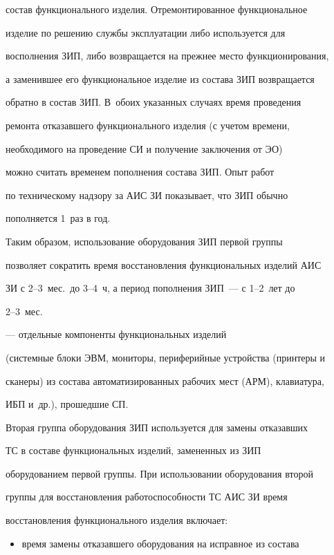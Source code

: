 \begin{description}
состав функционального изделия. Отремонтированное функциональное

изделие по решению службы эксплуатации либо используется для

восполнения ЗИП, либо возвращается на прежнее место функционирования,

а заменившее его функциональное изделие из состава ЗИП возвращается

обратно в состав ЗИП. В~обоих указанных случаях время проведения

ремонта отказавшего функционального изделия (с учетом времени,

необходимого на проведение СИ и получение заключения от ЭО)

можно считать временем пополнения состава ЗИП. Опыт работ

по техническому надзору за АИС ЗИ показывает, что ЗИП обычно

пополняется 1~раз в год.



     Таким образом, использование оборудования ЗИП первой группы

позволяет сократить время восстановления функциональных изделий АИС

ЗИ с 2--3~мес.\ до 3--4~ч, а период пополнения ЗИП~--- с 1--2~лет до

     2--3~мес.



\item[Группа 2] --- отдельные компоненты функциональных изделий

(системные блоки ЭВМ, мониторы, периферийные устройства (принтеры и

сканеры) из состава автоматизированных рабочих мест (АРМ), клавиатура,

ИБП и~др.), прошедшие СП.



     Вторая группа оборудования ЗИП используется для замены отказавших

ТС в составе функциональных изделий, замененных из ЗИП

оборудованием первой группы. При использовании оборудования второй

группы для восстановления работоспособности ТС АИС ЗИ время

восстановления функционального изделия включает:

     \begin{itemize}

     \item время замены отказавшего оборудования на исправное из состава


\end{itemize}
\end{description}

